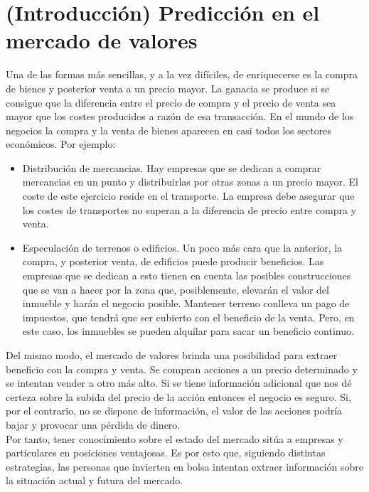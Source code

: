 \section{(Introducci\'on) Predicci\'on en el mercado de valores}

Una de las formas más sencillas, y a la vez dif\'iciles, de enriquecerse es la compra de bienes y posterior venta a un precio mayor. La ganacia se produce si se consigue que la diferencia entre el precio de compra y el precio de venta sea mayor que los costes producidos a raz\'on de esa transacci\'on. En el mundo de los negocios la compra y la venta de bienes aparecen en casi todos los sectores econ\'omicos. Por ejemplo:\\

\begin{itemize}
    \item Distribuci\'on de mercancias. Hay empresas que se dedican a comprar mercancias en un punto y distribuirlas por otras zonas a un precio mayor. El coste de este ejercicio reside en el transporte. La empresa debe asegurar que los costes de transportes no superan a la diferencia de precio entre compra y venta.
    
    \item Especulaci\'on de terrenos o edificios. Un poco m\'as cara que la anterior, la compra, y posterior venta, de edificios puede producir beneficios. Las empresas que se dedican a esto tienen en cuenta las posibles construcciones que se van a hacer por la zona que, posiblemente, elevar\'an el valor del inmueble y har\'an el negocio posible. Mantener terreno conlleva un pago de impuestos, que tendr\'a que ser cubierto con el beneficio de la venta. Pero, en este caso, los inmuebles se pueden alquilar para sacar un beneficio continuo.
\end{itemize}

Del mismo modo, el mercado de valores brinda una posibilidad para extraer beneficio con la compra y venta. Se compran acciones a un precio determinado y se intentan vender a otro m\'as alto. Si se tiene informaci\'on adicional que nos d\'e certeza sobre la subida del precio de la acci\'on entonces el negocio es seguro. Si, por el contrario, no se dispone de informaci\'on, el valor de las acciones podr\'ia bajar y provocar una p\'erdida de dinero.\\

Por tanto, tener conocimiento sobre el estado del mercado sit\'ua a empresas y particulares en posiciones ventajosas. Es por esto que, siguiendo distintas estrategias, las personas que invierten en bolsa intentan extraer informaci\'on sobre la situaci\'on actual y futura del mercado.\\

